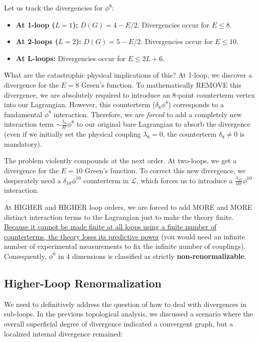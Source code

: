Let us track the divergencies for \(\phi^6\):
\begin{itemize}
    \item \textbf{At 1-loop (\(L=1\)):} \(D(G) = 4 - E/2\). Divergencies occur for \(E \leq 8\).
    \item \textbf{At 2-loops (\(L=2\)):} \(D(G) = 5 - E/2\). Divergencies occur for \(E \leq 10\).
    \item \textbf{At L-loops:} Divergencies occur for \(E \leq 2L + 6\).
\end{itemize}

What are the catastrophic physical implications of this?
At 1-loop, we discover a divergence for the \(E=8\) Green's function.
To mathematically REMOVE this divergence, we are absolutely required to introduce an 8-point counterterm vertex into our Lagrangian. However, this counterterm (\(\delta_8 \phi^8\)) corresponds to a fundamental \(\phi^8\) interaction. Therefore, we are \textit{forced} to add a completely new interaction term \(\sim \frac{\lambda_8}{8!} \phi^8\) to our original bare Lagrangian to absorb the divergence (even if we initially set the physical coupling \(\lambda_8 = 0\), the counterterm \(\delta_8 \neq 0\) is mandatory).

The problem violently compounds at the next order. At two-loops, we get a divergence for the \(E=10\) Green's function.
To correct this new divergence, we desperately need a \(\delta_{10} \phi^{10}\) counterterm in \(\mathcal{L}\), which forces us to introduce a \(\frac{\lambda_{10}}{10!} \phi^{10}\) interaction.

At HIGHER and HIGHER loop orders, we are forced to add MORE and MORE distinct interaction terms to the Lagrangian just to make the theory finite. \uline{Because it cannot be made finite at all loops using a finite number of counterterms, the theory loses its predictive power} (you would need an infinite number of experimental measurements to fix the infinite number of couplings). Consequently, \(\phi^6\) in 4 dimensions is classified as strictly \textbf{non-renormalizable}.

\subsection{Higher-Loop Renormalization}

We need to definitively address the question of how to deal with divergences in sub-loops. In the previous topological analysis, we discussed a scenario where the overall superficial degree of divergence indicated a convergent graph, but a localized internal divergence remained:

